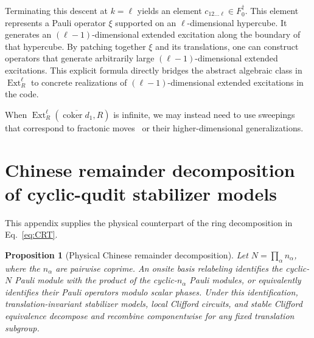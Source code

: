 \documentclass[aps,prx,english,superscriptaddress,twocolumn,tightenlines,showpacs,longbibliography,floatfix,amsfonts]{revtex4-2}
\newtheorem{proposition}{Proposition}
\theoremstyle{remark}
\theoremstyle{definition}
\begin{document}
Terminating this descent at $k = \ell$ yields an element $c_{12\dots \ell} \in F_0^\dagger$. This element represents a Pauli operator $\xi$ supported on an $\ell$-dimensional hypercube. It generates an $(\ell-1)$-dimensional extended excitation along the boundary of that hypercube. By patching together $\xi$ and its translations, one can construct operators that generate arbitrarily large $(\ell-1)$-dimensional extended excitations. This explicit formula directly bridges the abstract algebraic class in $\operatorname{Ext}_R^\ell$ to concrete realizations of $(\ell-1)$-dimensional extended excitations in the code.

When $\operatorname{Ext}_R^\ell (\overline{\operatorname{coker}d_1}, R)$ is infinite, we may instead need to use sweepings that correspond to fractonic moves~\cite{Haah2011PRA,Yoshida2013,Vijay2016,Song2024PRL} or their higher-dimensional generalizations.


\section{Chinese remainder decomposition of cyclic-qudit stabilizer models}
\label{app:crt-stabilizer-decomposition}

This appendix supplies the physical counterpart of the ring decomposition in
Eq.~\eqref{eq:CRT}.

\begin{proposition}[Physical Chinese remainder decomposition]
	\label{prop:physical-crt-decomposition}
	Let $N=\prod_\alpha n_\alpha$, where the $n_\alpha$ are pairwise
	coprime. An onsite basis relabeling identifies the cyclic-$N$ Pauli module
	with the product of the cyclic-$n_\alpha$ Pauli modules, or equivalently
	identifies their Pauli operators modulo scalar phases. Under this
	identification, translation-invariant stabilizer models, local Clifford
	circuits, and stable Clifford equivalence decompose and recombine
	componentwise for any fixed translation subgroup.
\end{proposition}
\end{document}
